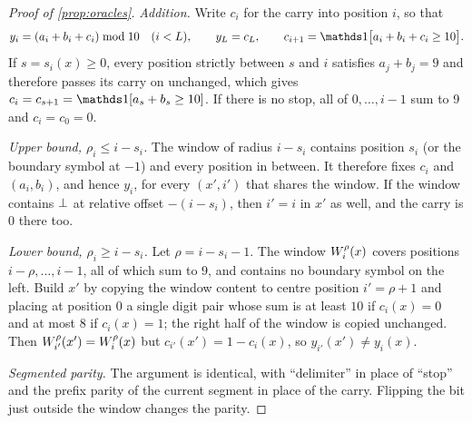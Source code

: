 \begin{proof}[Proof of \cref{prop:oracles}]
\emph{Addition.} Write $c_i$ for the carry into position $i$, so that
\begin{equation*}
  y_i = (a_i+b_i+c_i)\bmod 10 \quad (i<L),
  \qquad
  y_L = c_L,
  \qquad
  c_{i+1} = \ind\bigl[a_i+b_i+c_i\ge 10\bigr].
\end{equation*}
If $s=s_i(x)\ge 0$, every position strictly between $s$ and $i$ satisfies $a_j+b_j=9$ and therefore
passes its carry on unchanged, which gives $c_i = c_{s+1} = \ind[a_s+b_s\ge 10]$. If there is no stop,
all of $0,\dots,i-1$ sum to 9 and $c_i=c_0=0$.

\emph{Upper bound, $\rho_i\le i-s_i$.} The window of radius $i-s_i$ contains position $s_i$ (or the
boundary symbol at $-1$) and every position in between. It therefore fixes $c_i$ and $(a_i,b_i)$, and
hence $y_i$, for every $(x',i')$ that shares the window. If the window contains $\bot$ at relative
offset $-(i-s_i)$, then $i'=i$ in $x'$ as well, and the carry is $0$ there too.

\emph{Lower bound, $\rho_i\ge i-s_i$.} Let $\rho=i-s_i-1$. The window $W_{i}^{\rho}(x)$ covers positions
$i-\rho,\dots,i-1$, all of which sum to 9, and contains no boundary symbol on the left. Build $x'$ by
copying the window content to centre position $i'=\rho+1$ and placing at position $0$ a single digit
pair whose sum is at least $10$ if $c_i(x)=0$ and at most $8$ if $c_i(x)=1$; the right half of the window
is copied unchanged. Then $W_{i'}^{\rho}(x')=W_{i}^{\rho}(x)$ but $c_{i'}(x')=1-c_i(x)$, so
$y_{i'}(x')\ne y_i(x)$.

\emph{Segmented parity.} The argument is identical, with ``delimiter'' in place of ``stop'' and the
prefix parity of the current segment in place of the carry. Flipping the bit just outside the window
changes the parity.
\end{proof}

